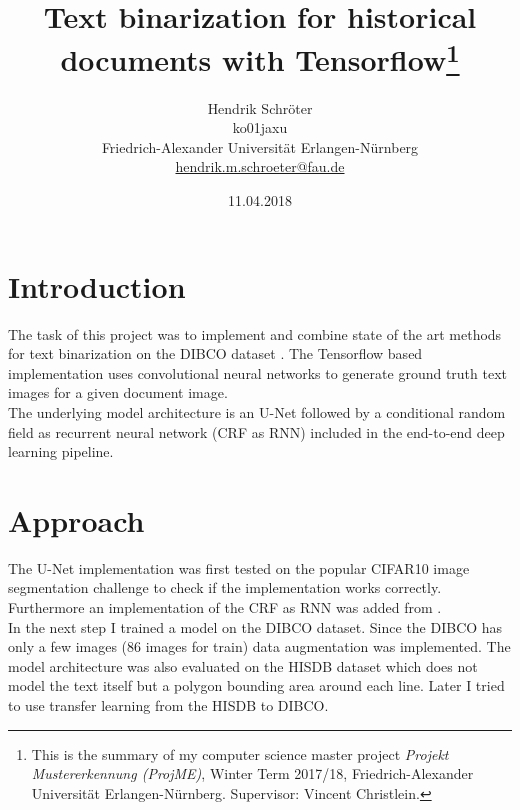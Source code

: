 \documentclass[a4paper, 9pt, twocolumn]{extarticle}
\begin{document}
\date{\normalsize 11.04.2018}

\title{\vspace{-8mm}\textbf{\Large
Text binarization for historical documents with Tensorflow\footnote{This is the
  summary of my computer science master project \emph{Projekt Mustererkennung
  (ProjME)}, Winter Term 2017/18, Friedrich-Alexander Universit\"at
  Erlangen-N\"urnberg.
  Supervisor: Vincent Christ\-lein.
}}}

\author{
{
\begin{minipage}{\textwidth}
\center
Hendrik Schröter\\
\small
ko01jaxu\\
Friedrich-Alexander Universit\"at Erlangen-N\"urnberg
\protect\\{} %
\url{hendrik.m.schroeter@fau.de}
\end{minipage}
}
}

\maketitle
\thispagestyle{empty}

\section{Introduction}
\label{section:introduction}

The task of this project was to implement and combine state of the art methods
for text binarization on the DIBCO dataset \cite{pratikakis2017icdar2017}. The
Tensorflow \cite{abadi2016tensorflow} based implementation uses convolutional
neural networks to generate ground truth text images for a given document
image. \\
The underlying model architecture is an U-Net \cite{ronneberger2015u}
followed by a conditional random field as recurrent neural network (CRF as RNN)
\cite{crfasrnn_ICCV2015} included in the end-to-end deep learning pipeline.


\section{Approach}
\label{section:approach}

The U-Net implementation was first tested on the popular CIFAR10 image
segmentation challenge to check if the implementation works correctly.
Furthermore an implementation of the CRF as RNN was added from
\cite{Jayasumana2017}.\\
In the next step I trained a model on the DIBCO dataset. Since the DIBCO has
only a few images (86 images for train) data augmentation was implemented. The
model architecture was also evaluated on the HISDB dataset which does not model
the text itself but a polygon bounding area around each line. Later I tried to
use transfer learning from the HISDB to DIBCO.
\end{document}
